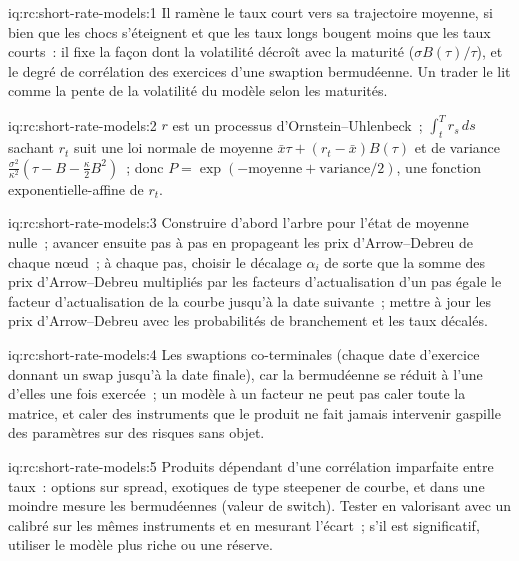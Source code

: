 \begin{solution}{iq:rc:short-rate-models:1}
Il ramène le taux court vers sa trajectoire moyenne, si bien que les chocs s'éteignent et que
les taux longs bougent moins que les taux courts~: il fixe la façon dont la volatilité décroît avec
la maturité ($\sigma B(\tau)/\tau$), et le degré de corrélation des exercices d'une swaption bermudéenne.
Un trader le lit comme la pente de la volatilité du modèle selon les maturités.
\end{solution}

\begin{solution}{iq:rc:short-rate-models:2}
$r$ est un processus d'Ornstein--Uhlenbeck~; $\int_t^Tr_s\,ds$ sachant $r_t$ suit une loi normale de moyenne $\bar
x\tau+(r_t-\bar x)B(\tau)$ et de variance $\frac{\sigma^2}{\kappa^2}(\tau-B-\frac\kappa2B^2)$~; donc
$P = \exp(-\text{moyenne}+\text{variance}/2)$, une fonction exponentielle-affine de $r_t$.
\end{solution}

\begin{solution}{iq:rc:short-rate-models:3}
Construire d'abord l'arbre pour l'état de moyenne nulle~; avancer ensuite pas à pas en propageant les
prix d'Arrow--Debreu de chaque nœud~; à chaque pas, choisir le décalage $\alpha_i$ de sorte que
la somme des prix d'Arrow--Debreu multipliés par les facteurs d'actualisation d'un pas égale le
facteur d'actualisation de la courbe jusqu'à la date suivante~; mettre à jour les prix d'Arrow--Debreu avec
les probabilités de branchement et les taux décalés.
\end{solution}

\begin{solution}{iq:rc:short-rate-models:4}
Les swaptions co-terminales (chaque date d'exercice donnant un swap jusqu'à la
date finale), car la bermudéenne se réduit à l'une d'elles une fois exercée~; un modèle à un facteur
ne peut pas caler toute la matrice, et caler des instruments que le produit
ne fait jamais intervenir gaspille des paramètres sur des risques sans objet.
\end{solution}

\begin{solution}{iq:rc:short-rate-models:5}
Produits dépendant d'une corrélation imparfaite entre taux~: options sur spread,
exotiques de type steepener de courbe, et dans une moindre mesure les bermudéennes (valeur de switch). Tester
en valorisant avec un  calibré sur les mêmes instruments et
en mesurant l'écart~; s'il est significatif, utiliser le modèle plus riche ou une réserve.
\end{solution}

